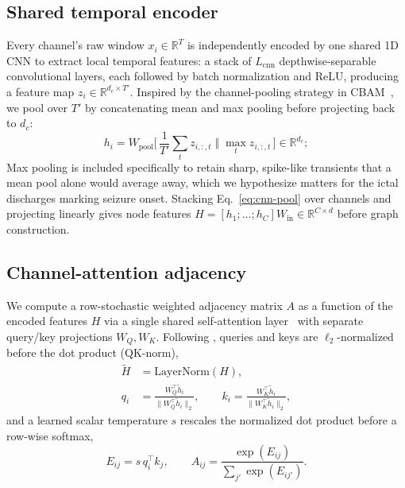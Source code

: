 \documentclass[letterpaper]{article}
\begin{document}
\subsection{Shared temporal encoder}
\label{ssec:encoder}

Every channel's raw window $x_i \in \mathbb{R}^{T}$ is independently
encoded by one shared 1D CNN to extract local temporal features: a stack of $L_{\mathrm{cnn}}$
depthwise-separable convolutional layers, each followed by batch
normalization and ReLU, producing a feature map
$z_i \in \mathbb{R}^{d_c \times T'}$. Inspired by
the channel-pooling strategy in CBAM~\cite{woo2018cbam}, we pool over $T'$ by concatenating mean and max
pooling before projecting back to $d_c$:
\begin{equation}
h_i = W_{\mathrm{pool}}
\Big[\,\textstyle\frac{1}{T'}\sum_{t} z_{i,:,t} \;\Vert\; \max_t z_{i,:,t}\,\Big] \in \mathbb{R}^{d_c};
\label{eq:cnn-pool}
\end{equation}
Max pooling is included specifically to retain sharp, spike-like transients that 
a mean pool alone would average away, which we hypothesize matters for the ictal 
discharges marking seizure onset. Stacking
Eq.~\eqref{eq:cnn-pool} over channels and projecting linearly gives node
features
$H = [h_1; \dots; h_C] W_{\mathrm{in}} \in \mathbb{R}^{C \times d}$
before graph construction.

\subsection{Channel-attention adjacency}
\label{ssec:graph}

We compute a row-stochastic weighted adjacency matrix $A$ as a function of the encoded features $H$ via a
single shared self-attention layer~\cite{vaswani2017attention} with
separate query/key projections $W_Q, W_K$. Following
\cite{henry-etal-2020-query}, queries and keys are $\ell_2$-normalized
before the dot product (QK-norm),
\begin{equation}
\begin{aligned}
\tilde H &= \mathrm{LayerNorm}(H), \\
q_i &= \frac{W_Q^{\top}\tilde{h}_i}{\lVert W_Q^{\top}\tilde{h}_i \rVert_2}, \qquad
k_i = \frac{W_K^{\top}\tilde{h}_i}{\lVert W_K^{\top}\tilde{h}_i \rVert_2},
\end{aligned}
\label{eq:qknorm}
\end{equation}
and a learned scalar temperature $s$ rescales the normalized dot product
before a row-wise softmax,
\begin{equation}
E_{ij} = s\, q_i^{\top} k_j, \qquad
A_{ij} = \frac{\exp(E_{ij})}{\sum_{j'} \exp(E_{ij'})}.
\label{eq:attn-adj}
\end{equation}
\end{document}
